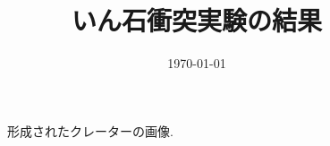\documentclass[a4paper]{ltjsarticle}
\begin{document}
\title{いん石衝突実験の結果}
\date{\today}
\maketitle
\thispagestyle{empty}
\begin{figure}[H]
    \caption{形成されたクレーターの画像.}
\end{figure}
\begin{figure}[H]
\end{figure}
\end{document}
